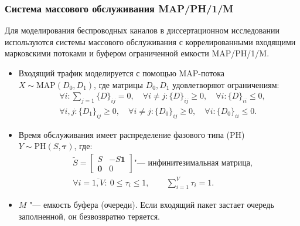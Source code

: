 \begin{frame}
    \frametitle{Система массового обслуживания MAP/PH/1/M}
    \small
    Для моделирования беспроводных каналов в диссертационном исследовании используются системы массового обслуживания с коррелированными входящими марковскими потоками и буфером ограниченной емкости MAP/PH/1/M.
    \footnotesize
    \begin{itemize}
        \item Входящий трафик моделируется с помощью MAP-потока $X \sim \text{MAP}(D_0, D_1)$, где матрицы $D_0, D_1$ удовлетворяют ограничениям:
        $$
            \begin{aligned}
                &\forall i: \sum\limits_{j=1} \{D\}_{ij} = 0, \quad
                \forall i \neq j: \{D\}_{ij} \geq 0, \quad
                \forall i: \{D\}_{ii} \leq 0,\\
                &\forall i, j: \{D_{1}\}_{ij} \geq 0,\quad
                \forall i \neq j: \{D_{0}\}_{ij} \geq 0, \quad
                \forall i: \{D_{0}\}_{ii} \leq 0.
            \end{aligned}
        $$
        \item Время обслуживания имеет распределение фазового типа (PH) $Y \sim \text{PH}(S, \bm{\tau})$, где:
        $$
            \begin{aligned}
                &\tilde{S} = \begin{bmatrix}
                S  & -S\mathbf{1} \\
                \mathbf{0} &  0
                \end{bmatrix} \mbox{"--- инфинитезимальная матрица,}\\
                &\forall i = \overline{1,V}: \: 0 \leq \tau_i \leq 1, \qquad
                \sum\limits_{i=1}^{V} \tau_i = 1.
            \end{aligned}
        $$
        \item $M$ "--- емкость буфера (очереди). Если входящий пакет застает очередь заполненной, он безвозвратно теряется.
    \end{itemize}
\end{frame}

